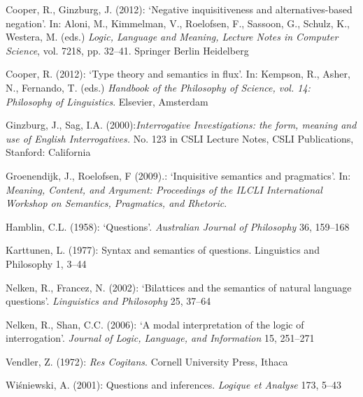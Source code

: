 \documentclass[a4wide]{article}
\begin{document}
\vspace{5pt}
{\small
\noindent [1] Cooper, R., Ginzburg, J. (2012): `Negative inquisitiveness and alternatives-based
  negation'. In: Aloni, M., Kimmelman, V., Roelofsen, F., Sassoon, G., Schulz,
  K., Westera, M. (eds.) {\it Logic, Language and Meaning, Lecture Notes in Computer
  Science}, vol. 7218, pp. 32--41. Springer Berlin Heidelberg 

\noindent [2] Cooper, R.  (2012): `Type theory and semantics in flux'. In: Kempson, R., Asher, N.,
  Fernando, T. (eds.) {\it Handbook of the Philosophy of Science, vol. 14:
  Philosophy of Linguistics}. Elsevier, Amsterdam

\noindent [3] Ginzburg, J., Sag, I.A. (2000):{\it  Interrogative Investigations: the form, meaning and
  use of English Interrogatives.} No. 123 in CSLI Lecture Notes, CSLI
  Publications, Stanford: California 

\noindent [4] Groenendijk, J., Roelofsen, F  (2009).: `Inquisitive semantics and pragmatics'. In:
  {\it Meaning, Content, and Argument: Proceedings of the ILCLI International
  Workshop on Semantics, Pragmatics, and Rhetoric}.

\noindent [5] Hamblin, C.L.  (1958): `Questions'. {\it Australian Journal of Philosophy}  36,  159--168
 
\noindent [6] Karttunen, L. (1977): Syntax and semantics of questions. Linguistics and Philosophy
  1,  3--44 

\noindent [7] Nelken, R., Francez, N.  (2002): `Bilattices and the semantics of natural language
  questions'. {\it Linguistics and Philosophy}  25,  37--64

\noindent [8] Nelken, R., Shan, C.C. (2006): `A modal interpretation of the logic of interrogation'.
 {\it  Journal of Logic, Language, and Information}  15,  251--271 

\noindent [9] Vendler, Z. (1972): {\it Res Cogitans}. Cornell University
Press, Ithaca 

\noindent [10] Wi{\'{s}}niewski, A.  (2001): Questions and
inferences. {\it Logique et Analyse}  173,  5--43
} 


%
%
\end{document}
